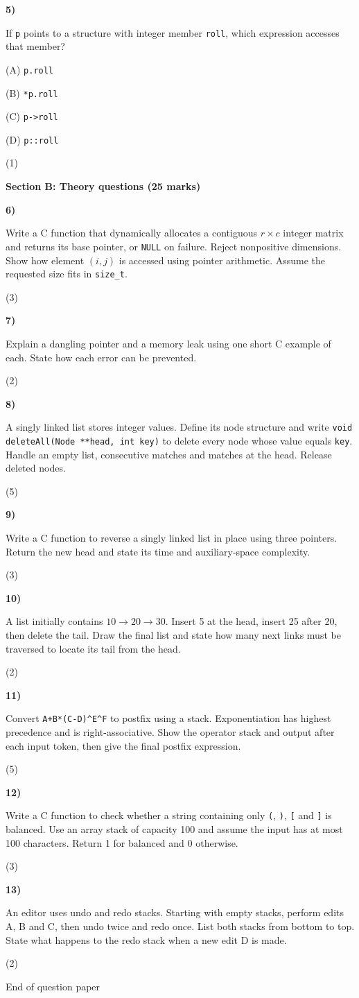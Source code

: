 \documentclass[11pt,a4paper]{article}
\newcommand{\question}[3]{\par\vspace{8pt}\noindent\begin{minipage}[t]{0.075\linewidth}\textbf{#1)}\end{minipage}\begin{minipage}[t]{0.855\linewidth}#3\end{minipage}\hfill\begin{minipage}[t]{0.055\linewidth}\raggedleft(#2)\end{minipage}\par}
\begin{document}
\question{5}{1}{If \texttt{p} points to a structure with integer member \texttt{roll}, which expression accesses that member?\par (A) \texttt{p.roll}\par (B) \texttt{*p.roll}\par (C) \texttt{p->roll}\par (D) \texttt{p::roll}}
\newpage\textbf{Section B: Theory questions (25 marks)}\par
\question{6}{3}{Write a C function that dynamically allocates a contiguous $r\times c$ integer matrix and returns its base pointer, or \texttt{NULL} on failure. Reject nonpositive dimensions. Show how element $(i,j)$ is accessed using pointer arithmetic. Assume the requested size fits in \texttt{size\_t}.}
\question{7}{2}{Explain a dangling pointer and a memory leak using one short C example of each. State how each error can be prevented.}
\question{8}{5}{A singly linked list stores integer values. Define its node structure and write \texttt{void deleteAll(Node **head, int key)} to delete every node whose value equals \texttt{key}. Handle an empty list, consecutive matches and matches at the head. Release deleted nodes.}
\question{9}{3}{Write a C function to reverse a singly linked list in place using three pointers. Return the new head and state its time and auxiliary-space complexity.}
\question{10}{2}{A list initially contains $10\to20\to30$. Insert 5 at the head, insert 25 after 20, then delete the tail. Draw the final list and state how many next links must be traversed to locate its tail from the head.}
\question{11}{5}{Convert \texttt{A+B*(C-D)\^{}E\^{}F} to postfix using a stack. Exponentiation has highest precedence and is right-associative. Show the operator stack and output after each input token, then give the final postfix expression.}
\question{12}{3}{Write a C function to check whether a string containing only \texttt{(}, \texttt{)}, \texttt{[} and \texttt{]} is balanced. Use an array stack of capacity 100 and assume the input has at most 100 characters. Return 1 for balanced and 0 otherwise.}
\question{13}{2}{An editor uses undo and redo stacks. Starting with empty stacks, perform edits A, B and C, then undo twice and redo once. List both stacks from bottom to top. State what happens to the redo stack when a new edit D is made.}
\vfill\begin{center}\small End of question paper\end{center}
\end{document}
